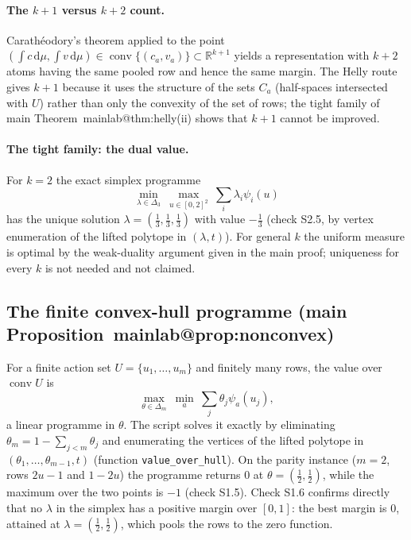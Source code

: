 \documentclass[11pt,a4paper]{article}
\makeatletter
\theoremstyle{plain}
\theoremstyle{definition}
\theoremstyle{remark}
\newcommand{\R}{\mathbb{R}}
\newcommand{\conv}{\operatorname{conv}}
\newcommand{\tfr}[2]{\tfrac{#1}{#2}}
\newcommand{\dd}{\,\mathrm{d}}
\newcommand{\mref}[1]{\csname mainlab@#1\endcsname}
\makeatother
\begin{document}
\paragraph{The $k+1$ versus $k+2$ count.} Carath\'eodory's theorem applied to the point $(\int c\dd\mu,\int v\dd\mu)\in\conv\{(c_a,v_a)\}\subset\R^{k+1}$ yields a representation with $k+2$ atoms having the same pooled row and hence the same margin. The Helly route gives $k+1$ because it uses the structure of the sets $C_a$ (half-spaces intersected with $U$) rather than only the convexity of the set of rows; the tight family of main Theorem~\mref{thm:helly}(ii) shows that $k+1$ cannot be improved.

\paragraph{The tight family: the dual value.} For $k=2$ the exact simplex programme
\[
\min_{\lambda\in\Delta_3}\ \max_{u\in[0,2]^2}\ \sum_i\lambda_i\psi_i(u)
\]
has the unique solution $\lambda=(\tfr13,\tfr13,\tfr13)$ with value $-\tfr13$ (check S2.5, by vertex enumeration of the lifted polytope in $(\lambda,t)$). For general $k$ the uniform measure is optimal by the weak-duality argument given in the main proof; uniqueness for every $k$ is not needed and not claimed.

\subsection{The finite convex-hull programme (main Proposition~\mref{prop:nonconvex})}
For a finite action set $U=\{u_1,\dots,u_m\}$ and finitely many rows, the value over $\conv U$ is
\[
\max_{\theta\in\Delta_m}\ \min_a\ \sum_j\theta_j\psi_a(u_j),
\]
a linear programme in $\theta$. The script solves it exactly by eliminating $\theta_m=1-\sum_{j<m}\theta_j$ and enumerating the vertices of the lifted polytope in $(\theta_1,\dots,\theta_{m-1},t)$ (function \texttt{value\_over\_hull}). On the parity instance ($m=2$, rows $2u-1$ and $1-2u$) the programme returns $0$ at $\theta=(\tfr12,\tfr12)$, while the maximum over the two points is $-1$ (check S1.5). Check S1.6 confirms directly that no $\lambda$ in the simplex has a positive margin over $[0,1]$: the best margin is $0$, attained at $\lambda=(\tfr12,\tfr12)$, which pools the rows to the zero function.
\end{document}
